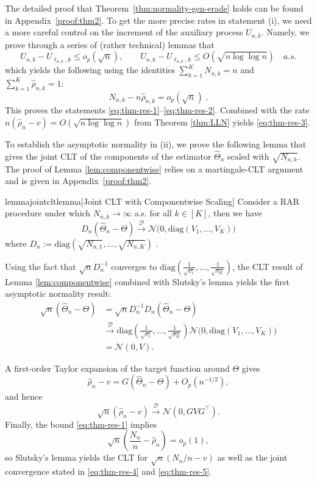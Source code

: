 	\smallskip

	The detailed proof that Theorem~\ref{thm:normality-gen-erade} holds can be found in Appendix~\ref{proof:thm2}. To get the more precise rates in statement (i), we need a more careful control on the increment of the auxiliary process $U_{n,k}$. Namely, we prove through a series of (rather technical) lemmas that
	\[
	U_{n,k}-U_{\ell_{n,k},k}\leq o_p(\sqrt n),
	\qquad
	U_{n,k}-U_{\ell_{n,k},k}\leq O(\sqrt{n\log\log n}) \quad a.s.
	\]
	which yields the following using the identities $\sum_{k=1}^K N_{n,k}=n$ and $\sum_{k=1}^K \hat\rho_{n,k}=1$:
	\[
	N_{n,k}-n\hat\rho_{n,k}=o_p(\sqrt n)\;.
	\]
    This proves the statements \eqref{eq:thm-res-1}--\eqref{eq:thm-res-2}. 	Combined with the rate \(n(\hat\rho_n-v)=O(\sqrt{n\log\log n})\)
	from Theorem \ref{thm:LLN} yields \eqref{eq:thm-res-3}.
	
	To establish the asymptotic normality in (ii), we prove the following lemma that gives the joint CLT of the components of the estimator \(\hat{\Theta}_n\) scaled with \(\sqrt{N_{n,k}}\). The proof of Lemma \ref{lem:componentwise} relies on a martingale-CLT argument and is given in Appendix~\ref{proof:thm2}.
	
		\begin{restatable}{lemma}{jointcltlemma}[Joint CLT with Componentwise Scaling]\label{lem:componentwise} 
			Consider a RAR procedure under which $N_{n,k}\to\infty$ a.s. for all $k \in [K]$, then we have
			\[
			D_n(\hat\Theta_n-\Theta)\xrightarrow{\mathcal{D}}
			\mathcal N\!\big(0,\mathrm{diag}\left(V_1,\dots,V_K\right)\big)
			\]
			where $D_n:=\mathrm{diag}(\sqrt{N_{n,1}},\dots,\sqrt{N_{n,K}})\;.$
		\end{restatable}
		
		Using the fact that \(\sqrt n D_n^{-1}\) converges to \(\mathrm{diag}\left(\frac{1}{\sqrt{v_1}},\ldots,\frac{1}{\sqrt{v_K}}\right)\), the CLT result of Lemma \ref{lem:componentwise} combined with Slutsky's lemma yields the first asymptotic normality result:
		\begin{align*}
			\sqrt n(\hat\Theta_n-\Theta) &= \sqrt n D_n^{-1} D_n(\hat\Theta_n-\Theta)\\
			&\xrightarrow{\mathcal{D}}\mathrm{diag}\left(\frac{1}{\sqrt{v_1}},\ldots,\frac{1}{\sqrt{v_K}}\right) \mathcal N\!\big(0,\mathrm{diag}\left(V_1,\dots,V_K\right)\big)\\ 
			&= \mathcal N(0,V).
		\end{align*}

	
	A first-order Taylor expansion of the target function around $\Theta$ gives
	\[
	\hat\rho_n-v
	= G(\hat\Theta_n-\Theta) + O_p(n^{-1/2}),
	\]
	and hence
	\[
	\sqrt n(\hat\rho_n-v)\xrightarrow{\mathcal{D}}\mathcal N(0,GVG^\top).
	\]
	Finally, the bound \eqref{eq:thm-res-1} implies
	\[
	\sqrt n\!\left(\frac{N_n}{n}-\hat\rho_n\right)=o_p(1),
	\]
	so Slutsky’s lemma yields the CLT for $\sqrt n(N_n/n-v)$ as well as the joint convergence stated in \eqref{eq:thm-res-4} and \eqref{eq:thm-res-5}.
	

